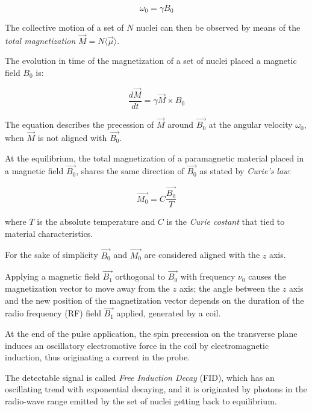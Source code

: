 \documentclass[12pt,openright,twoside,a4paper]{book}
\begin{document}
\begin{equation}
\omega_0=\gamma B_0
\end{equation}
\vspace{5mm}

The collective motion of a set of $N$ nuclei can then be observed by means of the \textit{total magnetization} $\overrightarrow{M}=N\langle \overrightarrow{\mu}\rangle$.

The evolution in time of the magnetization  of a set of nuclei placed a magnetic  field $B_0$ is:

\begin{equation}
\frac{d\overrightarrow{M}}{dt}=\gamma \overrightarrow{M} \times B_0
\end{equation}

The equation describes the precession of $\overrightarrow{M}$ around $\overrightarrow{B_0}$ at the angular velocity $\omega_0$, when $\overrightarrow{M}$ is not aligned with $\overrightarrow{B_0}$.

At the equilibrium, the total magnetization of a paramagnetic material placed in a magnetic field $\overrightarrow{B_0}$, shares the same direction of $\overrightarrow{B_0}$ as stated by \textit{Curie's law}:

\begin{equation}
\overrightarrow{M_0}=C\frac{\overrightarrow{B_0}}{T}
\end{equation}

where $T$ is the absolute temperature and $C$ is the \textit{Curie costant} that tied to material characteristics.

For the sake of simplicity $\overrightarrow{B_0}$ and $\overrightarrow{M_0}$ are considered aligned with the $z$ axis.
\vspace{5mm}

Applying a magnetic field  $\overrightarrow{B_1}$ orthogonal to  $\overrightarrow{B_0}$ with frequency $\nu_0$ causes the magnetization vector to move away from the $z$ axis; the angle between the $z$ axis and the new position of the magnetization vector depends on the duration of the radio frequency (RF)  field $\overrightarrow{B_1}$ applied, generated by a coil.

At the end of the pulse application, the spin precession on the transverse plane induces an oscillatory electromotive force in the coil by electromagnetic induction, thus originating a current in the probe.

The detectable signal is called \textit{Free Induction Decay} (FID), which has an oscillating trend with exponential decaying, and it is originated by photons in the radio-wave range emitted by the set of nuclei getting back to equilibrium.
\end{document}
